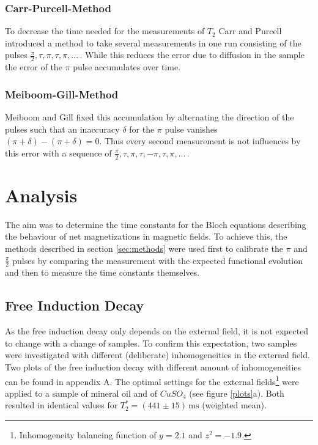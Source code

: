 \documentclass[a4paper]{scrartcl}
\numberwithin{equation}{section}
\numberwithin{figure}{section}
\numberwithin{table}{section}
\begin{document}
\subsubsection*{Carr-Purcell-Method}
To decrease the time needed for the measurements of $T_2$ Carr and Purcell introduced a method to take several measurements in one run consisting of the pulses $\frac{\pi}{2},\tau,\pi,\tau,\pi,...\,$. While this reduces the error due to diffusion in the sample the error of the $\pi$ pulse accumulates over time.

\subsubsection*{Meiboom-Gill-Method}
Meiboom and Gill fixed this accumulation by alternating the direction of the pulses such that an inaccuracy $\delta$ for the $\pi$ pulse vanishes $(\pi+\delta)-(\pi+\delta)=0$. Thus every second measurement is not influences by this error with a sequence of $\frac{\pi}{2},\tau,\pi,\tau,-\pi,\tau,\pi,...\,$.



\section{Analysis}
The aim was to determine the time constants for the Bloch equations describing the behaviour of net magnetizations in magnetic fields. To achieve this, the methods described in section \ref{sec:methods} were used first to calibrate the $\pi$ and $\frac{\pi}{2}$ pulses by comparing the measurement with the expected functional evolution and then to measure the time constants themselves.

\subsection{Free Induction Decay}
As the free induction decay only depends on the external field, it is not expected to change with a change of samples. To confirm this expectation, two samples were investigated with different (deliberate) inhomogeneities in the external field. Two plots of the free induction decay with different amount of inhomogeneities can be found in appendix A. The optimal settings for the external fields\footnote{Inhomogeneity balancing function of $y=2.1$ and $z^2 = -1.9$.} were applied to a sample of mineral oil and of $CuSO_4$ (see figure \ref{plots}a). Both resulted in identical values for $T_2^* = (441\pm 15)\,\text{ms}$ (weighted mean).



\FloatBarrier
\clearpage
 

\end{document}
